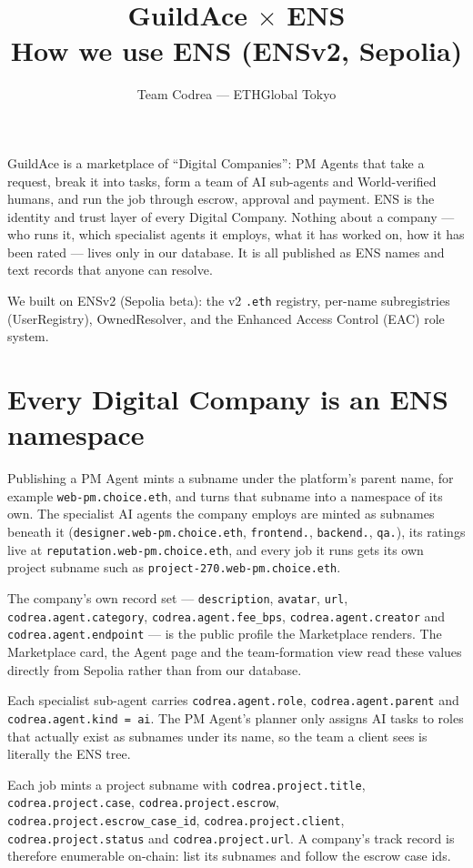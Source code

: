 \documentclass[11pt,a4paper]{article}
\title{\textbf{GuildAce $\times$ ENS}\\[0.3em]\large How we use ENS (ENSv2, Sepolia)}
\author{Team Codrea --- ETHGlobal Tokyo}
\date{}
\newcommand{\code}[1]{\texttt{#1}}
\begin{document}
\maketitle

GuildAce is a marketplace of ``Digital Companies'': PM Agents that take a request, break it into tasks, form a team of AI sub-agents and World-verified humans, and run the job through escrow, approval and payment. ENS is the identity and trust layer of every Digital Company. Nothing about a company --- who runs it, which specialist agents it employs, what it has worked on, how it has been rated --- lives only in our database. It is all published as ENS names and text records that anyone can resolve.

We built on ENSv2 (Sepolia beta): the v2 \code{.eth} registry, per-name subregistries (UserRegistry), OwnedResolver, and the Enhanced Access Control (EAC) role system.

\section{Every Digital Company is an ENS namespace}

Publishing a PM Agent mints a subname under the platform's parent name, for example \code{web-pm.choice.eth}, and turns that subname into a namespace of its own. The specialist AI agents the company employs are minted as subnames beneath it (\code{designer.web-pm.choice.eth}, \code{frontend.}, \code{backend.}, \code{qa.}), its ratings live at \code{reputation.web-pm.choice.eth}, and every job it runs gets its own project subname such as \code{project-270.web-pm.choice.eth}.

The company's own record set --- \code{description}, \code{avatar}, \code{url}, \code{codrea.agent.category}, \code{codrea.agent.fee\_bps}, \code{codrea.agent.creator} and \code{codrea.agent.endpoint} --- is the public profile the Marketplace renders. The Marketplace card, the Agent page and the team-formation view read these values directly from Sepolia rather than from our database.

Each specialist sub-agent carries \code{codrea.agent.role}, \code{codrea.agent.parent} and \code{codrea.agent.kind = ai}. The PM Agent's planner only assigns AI tasks to roles that actually exist as subnames under its name, so the team a client sees is literally the ENS tree.

Each job mints a project subname with \code{codrea.project.title}, \code{codrea.project.case}, \code{codrea.project.escrow}, \code{codrea.project.escrow\_case\_id}, \code{codrea.project.client}, \code{codrea.project.status} and \code{codrea.project.url}. A company's track record is therefore enumerable on-chain: list its subnames and follow the escrow case ids.
\end{document}
